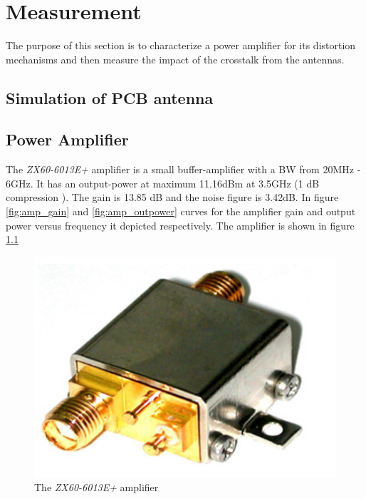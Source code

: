 \chapter{Measurement}\label{ch:measurement}
The purpose of this section is to characterize a power amplifier for its distortion mechanisms and then measure the impact of the crosstalk from the antennas. 

\section{Simulation of PCB antenna}

\section{Power Amplifier}
The  \textit{ZX60-6013E+} amplifier is a small buffer-amplifier with a BW from 20MHz - 6GHz. It has an output-power at maximum 11.16dBm at 3.5GHz (1 dB compression ). The gain is 13.85 dB and the noise figure is 3.42dB. In figure \ref{fig:amp_gain} and \ref{fig:amp_outpower} curves for the amplifier gain and output power versus frequency it depicted respectively. The amplifier is shown in figure \ref{fig:amplifier} 

\begin{figure}[H]
\centering 
\includegraphics[scale = 0.3]{figures/measurement/amplifier.png}
\caption{The \textit{ZX60-6013E+} amplifier}
\label{fig:amplifier}
\end{figure} 

